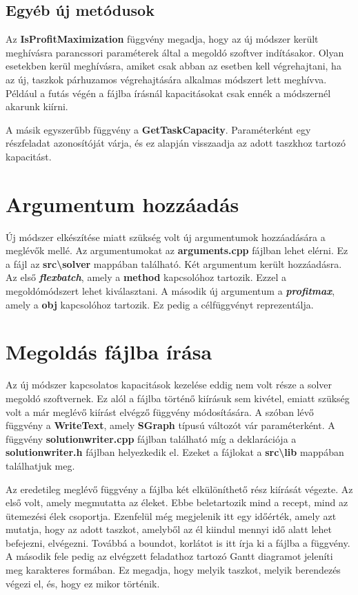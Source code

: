 \subsection{Egyéb új metódusok}
Az \textbf{IsProfitMaximization} függvény megadja, hogy az új módszer került meghívásra parancssori paraméterek által a megoldó szoftver indításakor. Olyan esetekben kerül meghívásra, amiket csak abban az esetben kell végrehajtani, ha az új, taszkok párhuzamos végrehajtására alkalmas módszert lett meghívva. Például a futás végén a fájlba írásnál kapacitásokat csak ennék a módszernél akarunk kiírni.

A másik egyszerűbb függvény a \textbf{GetTaskCapacity}. Paraméterként egy részfeladat azonosítóját várja, és ez alapján visszaadja az adott taszkhoz tartozó kapacitást.

\section{Argumentum hozzáadás}
Új módszer elkészítése miatt szükség volt új argumentumok hozzáadására a meglévők mellé. Az argumentumokat az \textbf{arguments.cpp} fájlban lehet elérni. Ez a fájl az \textbf{src\textbackslash solver} mappában található. Két argumentum került hozzáadásra. Az első \textbf{\textit{flexbatch}}, amely a \textbf{method} kapcsolóhoz tartozik. Ezzel a megoldómódszert lehet kiválasztani. A második új argumentum a \textbf{\textit{profit\textunderscore max}}, amely a \textbf{obj} kapcsolóhoz tartozik. Ez pedig a célfüggvényt reprezentálja.

\section{Megoldás fájlba írása}
Az új módszer kapcsolatos kapacitások kezelése eddig nem volt része a solver megoldó szoftvernek. Ez alól a fájlba történő kiírásuk sem kivétel, emiatt szükség volt a már meglévő kiírást elvégző függvény módosítására. A szóban lévő függvény a \textbf{WriteText}, amely \textbf{SGraph} típusú változót vár paraméterként. A függvény \textbf{solutionwriter.cpp} fájlban található míg a deklarációja a \textbf{solutionwriter.h} fájlban helyezkedik el. Ezeket a fájlokat a \textbf{src\textbackslash lib} mappában találhatjuk meg. 

Az eredetileg meglévő függvény a fájlba két elkülöníthető rész kiírását végezte. Az első volt, amely megmutatta az éleket. Ebbe beletartozik mind a recept, mind az ütemezési élek csoportja. Ezenfelül még megjelenik itt egy időérték, amely azt mutatja, hogy az adott taszkot, amelyből az él kiindul mennyi idő alatt lehet befejezni, elvégezni. Továbbá a boundot, korlátot is itt írja ki a fájlba a függvény. A második fele pedig az elvégzett feladathoz tartozó Gantt diagramot jeleníti meg karakteres formában. Ez megadja, hogy melyik taszkot, melyik berendezés végezi el, és, hogy ez mikor történik.

